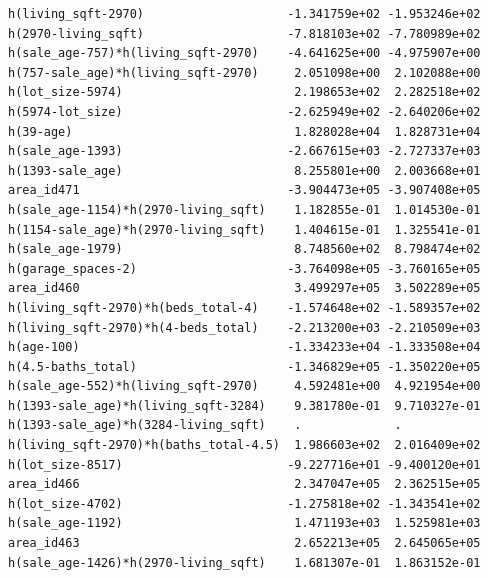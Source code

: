 \documentclass[
]{article}
\begin{document}
\begin{verbatim}
h(living_sqft-2970)                    -1.341759e+02 -1.953246e+02
h(2970-living_sqft)                    -7.818103e+02 -7.780989e+02
h(sale_age-757)*h(living_sqft-2970)    -4.641625e+00 -4.975907e+00
h(757-sale_age)*h(living_sqft-2970)     2.051098e+00  2.102088e+00
h(lot_size-5974)                        2.198653e+02  2.282518e+02
h(5974-lot_size)                       -2.625949e+02 -2.640206e+02
h(39-age)                               1.828028e+04  1.828731e+04
h(sale_age-1393)                       -2.667615e+03 -2.727337e+03
h(1393-sale_age)                        8.255801e+00  2.003668e+01
area_id471                             -3.904473e+05 -3.907408e+05
h(sale_age-1154)*h(2970-living_sqft)    1.182855e-01  1.014530e-01
h(1154-sale_age)*h(2970-living_sqft)    1.404615e-01  1.325541e-01
h(sale_age-1979)                        8.748560e+02  8.798474e+02
h(garage_spaces-2)                     -3.764098e+05 -3.760165e+05
area_id460                              3.499297e+05  3.502289e+05
h(living_sqft-2970)*h(beds_total-4)    -1.574648e+02 -1.589357e+02
h(living_sqft-2970)*h(4-beds_total)    -2.213200e+03 -2.210509e+03
h(age-100)                             -1.334233e+04 -1.333508e+04
h(4.5-baths_total)                     -1.346829e+05 -1.350220e+05
h(sale_age-552)*h(living_sqft-2970)     4.592481e+00  4.921954e+00
h(1393-sale_age)*h(living_sqft-3284)    9.381780e-01  9.710327e-01
h(1393-sale_age)*h(3284-living_sqft)    .             .           
h(living_sqft-2970)*h(baths_total-4.5)  1.986603e+02  2.016409e+02
h(lot_size-8517)                       -9.227716e+01 -9.400120e+01
area_id466                              2.347047e+05  2.362515e+05
h(lot_size-4702)                       -1.275818e+02 -1.343541e+02
h(sale_age-1192)                        1.471193e+03  1.525981e+03
area_id463                              2.652213e+05  2.645065e+05
h(sale_age-1426)*h(2970-living_sqft)    1.681307e-01  1.863152e-01
                                                                  

\end{verbatim}
\end{document}
